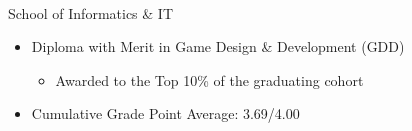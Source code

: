 \documentclass[a4paper,10pt]{article}
\begin{document}
\begin{paracol}{2}
    \begin{rightcolumn}
      \Large\noindent{}
      \vspace{0.15cm}\\
      \normalsize{} \textbar{} School of Informatics \& IT \hfill\small{}
      \begin{itemize}[left=0pt, labelsep=0.5em, itemsep=0pt, topsep=0pt, parsep=0pt, partopsep=0pt]
        \item \lato Diploma with Merit in Game Design \& Development (GDD)
          \begin{itemize}[left=0pt, labelsep=0.5em, itemsep=0pt, topsep=0pt, parsep=0pt, partopsep=0pt]
            \item \lato Awarded to the Top 10\% of the graduating cohort
          \end{itemize}
        \item \lato Cumulative Grade Point Average: 3.69/4.00
      \end{itemize}
            
      \vspace{0.35cm}


\end{rightcolumn}
\end{paracol}
\end{document}
